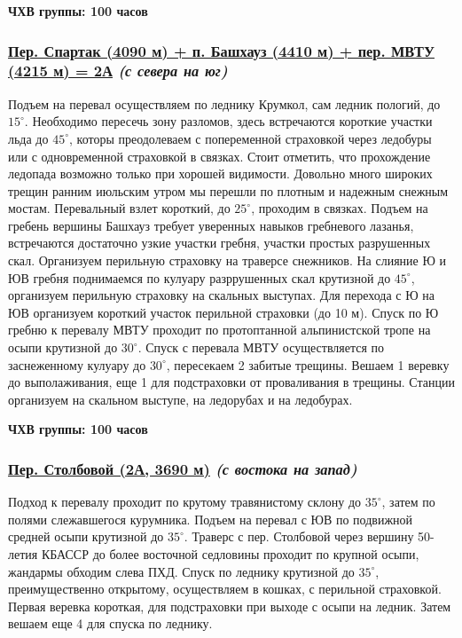 			{\bf ЧХВ группы: 100 часов}

		\subsubsection*{%
			\hyperref[subsec:Day6]{Пер. Спартак (4090 м) + п. Башхауз (4410 м) + пер. МВТУ (4215 м) = 2А}
			{\it (с севера на юг)}%
		}
			Подъем на перевал осуществляем по леднику Крумкол, сам ледник пологий, до $15^\circ$. Необходимо
			пересечь зону разломов, здесь встречаются короткие участки льда до $45^\circ$, которы преодолеваем
			с попеременной страховкой через ледобуры или с одновременной страховкой в связках. Стоит отметить,
			что прохождение ледопада возможно только при хорошей видимости. Довольно много широких трещин ранним
			июльским утром мы перешли по плотным и надежным снежным мостам. Перевальный взлет короткий, до $25^\circ$,
			проходим в связках. Подъем на гребень вершины Башхауз требует уверенных навыков гребневого лазанья,
			встречаются достаточно узкие участки гребня, участки простых разрушенных скал. Организуем перильную
			страховку на траверсе снежников. На слияние Ю и ЮВ гребня поднимаемся по кулуару разррушенных скал
			крутизной до $45^\circ$, организуем перильную страховку на скальных выступах. Для перехода с Ю на ЮВ
			организуем короткий участок перильной страховки (до 10 м). Спуск по Ю гребню к перевалу МВТУ проходит
			по протоптанной альпинистской тропе на осыпи крутизной до $30^\circ$. Спуск с перевала МВТУ
			осуществляется по заснеженному кулуару до $30^\circ$, пересекаем 2 забитые трещины. Вешаем 1 веревку до
			выполаживания, еще 1 для подстраховки от проваливания в трещины. Станции организуем на скальном выступе,
			на ледорубах и на ледобурах.
			
			{\bf ЧХВ группы: 100 часов}

		\subsubsection*{%
			\hyperref[subsec:Day11]{Пер. Столбовой (2А, 3690 м)}
			{\it (с востока на запад)}%
		}
			Подход к перевалу проходит по крутому травянистому склону  до $35^\circ$, затем по полями слежавшегося
			курумника. Подъем на перевал с ЮВ по подвижной средней осыпи крутизной до $35^\circ$. Траверс с
			пер. Столбовой через вершину 50-летия КБАССР до более восточной седловины проходит по крупной осыпи,
			жандармы обходим слева ПХД. Спуск по леднику крутизной до $35^\circ$, преимущественно открытому,
			осуществляем в кошках, с перильной страховкой. Первая веревка короткая, для подстраховки при выходе
			с осыпи на ледник. Затем вешаем еще 4 для спуска по леднику.
			
